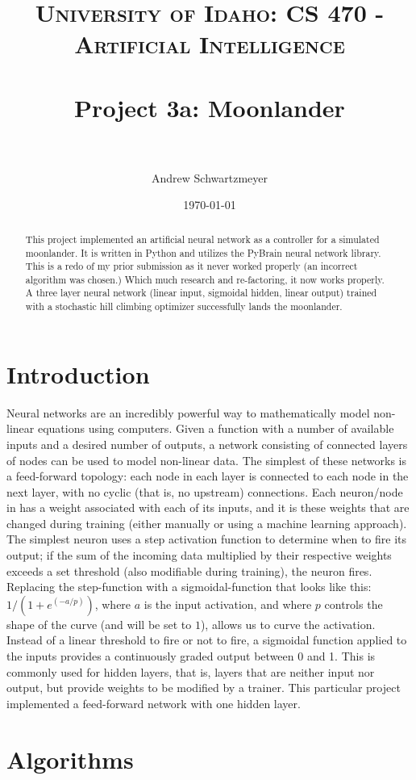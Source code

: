 \documentclass[12pt, article]{scrartcl}
\title{	
\normalfont \normalsize 
\textsc{University of Idaho: CS 470 - Artificial Intelligence} \\ [25pt]
\horrule{0.5pt} \\[0.4cm]
\huge Project 3a: Moonlander\\
\horrule{2pt} \\[0.5cm]
}
\author{Andrew Schwartzmeyer}
\date{\normalsize\today}
\begin{document}
\maketitle 
\begin{abstract}
This project implemented an artificial neural network as a controller for a simulated moonlander. It is written in Python and utilizes the PyBrain neural network library. This is a redo of my prior submission as it never worked properly (an incorrect algorithm was chosen.) Which much research and re-factoring, it now works properly. A three layer neural network (linear input, sigmoidal hidden, linear output) trained with a stochastic hill climbing optimizer successfully lands the moonlander.
\end{abstract}
\pagebreak
\section{Introduction}
Neural networks are an incredibly powerful way to mathematically model non-linear equations using computers. Given a function with a number of available inputs and a desired number of outputs, a network consisting of connected layers of nodes can be used to model non-linear data. The simplest of these networks is a feed-forward topology: each node in each layer is connected to each node in the next layer, with no cyclic (that is, no upstream) connections. Each neuron/node in has a weight associated with each of its inputs, and it is these weights that are changed during training (either manually or using a machine learning approach). The simplest neuron uses a step activation function to determine when to fire its output; if the sum of the incoming data multiplied by their respective weights exceeds a set threshold (also modifiable during training), the neuron fires. Replacing the step-function with a sigmoidal-function that looks like this: $1/(1+e^(-a/p))$, where $a$ is the input activation, and where $p$ controls the shape of the curve (and will be set to $1$), allows us to curve the activation. Instead of a linear threshold to fire or not to fire, a sigmoidal function applied to the inputs provides a continuously graded output between 0 and 1. This is commonly used for hidden layers, that is, layers that are neither input nor output, but provide weights to be modified by a trainer. This particular project implemented a feed-forward network with one hidden layer.
\section{Algorithms}
\end{document}
